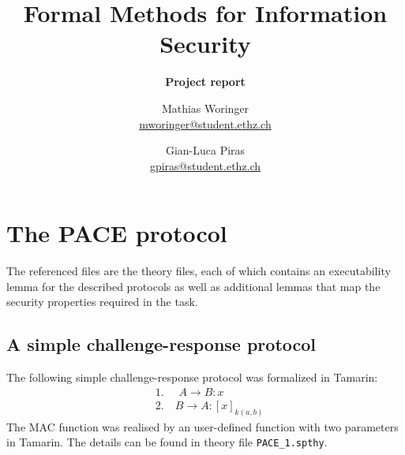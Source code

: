 \documentclass[a4paper,11pt]{scrartcl}
\title{Formal Methods for Information Security}
\author{Mathias Woringer \\ \href{mailto:mworinger@student.ethz.ch} {mworinger@student.ethz.ch}
\and Gian-Luca Piras \\ \href{mailto:gpiras@student.ethz.ch}{gpiras@student.ethz.ch}}
\subtitle{\textbf{Project report}}
\begin{document}
\maketitle

\section{The PACE protocol}
The  referenced files are the theory files, each of which contains an executability lemma for the described protocols as well as additional lemmas that map the security properties required in the task.
\subsection{A simple challenge-response protocol}
The following simple challenge-response protocol was formalized in Tamarin:
\begin{align*}
  &\text{1. }\quad A \rightarrow B: x\\
  &\text{2.} \quad B \rightarrow A: [x]_{k(a,b)}
\end{align*}
The MAC function was realised by an user-defined function with two parameters in Tamarin.  The details can be found in theory file \texttt{PACE\_1.spthy}.
\end{document}

